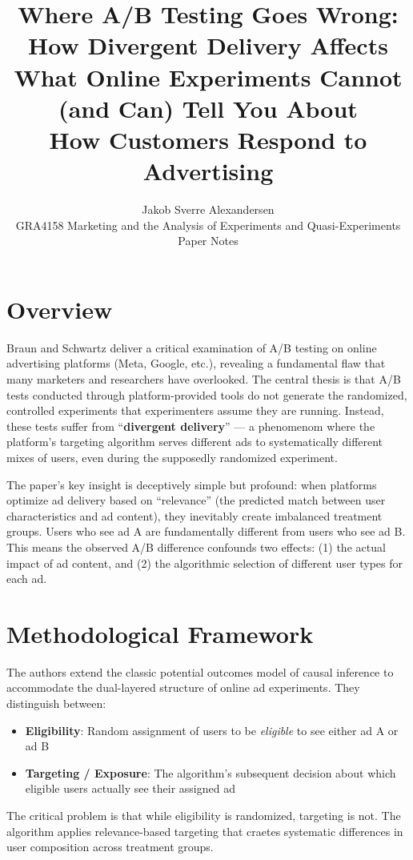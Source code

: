 \documentclass[10pt]{article}
\begin{document}
 
\title{Where A/B Testing Goes Wrong: How Divergent Delivery Affects\\What Online Experiments Cannot (and Can) Tell You About\\How Customers Respond to Advertising}
\author{Jakob Sverre Alexandersen\\
GRA4158 Marketing and the Analysis of Experiments and Quasi-Experiments\\
Paper Notes}
\maketitle

\tableofcontents
\newpage
\section{Overview}
Braun and Schwartz deliver a critical examination of A/B testing on online advertising platforms (Meta, Google, etc.), revealing a fundamental flaw that many marketers and researchers have overlooked. The central thesis is that A/B tests conducted through platform-provided tools do not generate the randomized, controlled experiments that experimenters assume they are running. Instead, these tests suffer from ``\textbf{divergent delivery}'' --- a phenomenom where the platform's targeting algorithm serves different ads to systematically different mixes of users, even during the supposedly randomized experiment. 

The paper's key insight is deceptively simple but profound: when platforms optimize ad delivery based on ``relevance'' (the predicted match between user characteristics and ad content), they inevitably create imbalanced treatment groups. Users who see ad A are fundamentally different from users who see ad B. This means the observed A/B difference confounds two effects: (1) the actual impact of ad content, and (2) the algorithmic selection of different user types for each ad. 

\section{Methodological Framework}
The authors extend the classic potential outcomes model of causal inference to accommodate the dual-layered structure of online ad experiments. They distinguish between:
\begin{itemize}
    \item \textbf{Eligibility}: Random assignment of users to be \textit{eligible} to see either ad A or ad B
    \item \textbf{Targeting / Exposure}: The algorithm's subsequent decision about which eligible users actually see their assigned ad 
\end{itemize}
The critical problem is that while eligibility is randomized, targeting is not. The algorithm applies relevance-based targeting that craetes systematic differences in user composition across treatment groups. 
\end{document}

